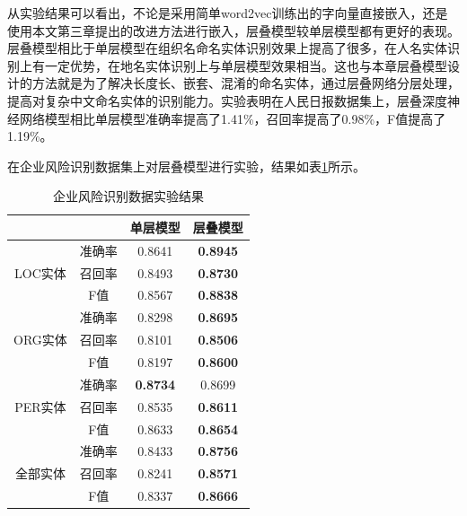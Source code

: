 \documentclass[winfonts,master,oneside,nobackinfo]{njuthesis}
\begin{document}
从实验结果可以看出，不论是采用简单word2vec训练出的字向量直接嵌入，还是使用本文第三章提出的改进方法进行嵌入，层叠模型较单层模型都有更好的表现。层叠模型相比于单层模型在组织名命名实体识别效果上提高了很多，在人名实体识别上有一定优势，在地名实体识别上与单层模型效果相当。这也与本章层叠模型设计的方法就是为了解决长度长、嵌套、混淆的命名实体，通过层叠网络分层处理，提高对复杂中文命名实体的识别能力。实验表明在人民日报数据集上，层叠深度神经网络模型相比单层模型准确率提高了1.41\%，召回率提高了0.98\%，F值提高了1.19\%。

在企业风险识别数据集上对层叠模型进行实验，结果如表\ref{risk}所示。
\begin{table}[H]
\centering
\begin{tabular}{|c|c|c|c|}
\hline
\multicolumn{2}{|c|}{}                  & 单层模型           & 层叠模型          \\ \hline
\multirow{3}{*}{LOC实体}       & 准确率      & 0.8641         & \textbf{0.8945}        \\ \cline{2-4} 
                             & 召回率      & 0.8493         & \textbf{0.8730}        \\ \cline{2-4} 
                             & F值       & 0.8567         & \textbf{0.8838}        \\ \hline
\multirow{3}{*}{ORG实体}       & 准确率      & 0.8298         & \textbf{0.8695}        \\ \cline{2-4} 
                             & 召回率      & 0.8101         & \textbf{0.8506}        \\ \cline{2-4} 
                             & F值       & 0.8197         & \textbf{0.8600}        \\ \hline
\multirow{3}{*}{PER实体}       & 准确率      & \textbf{0.8734}         & 0.8699        \\ \cline{2-4} 
                             & 召回率      & 0.8535         & \textbf{0.8611}        \\ \cline{2-4} 
                             & F值       & 0.8633         & \textbf{0.8654}        \\ \hline
\multirow{3}{*}{全部实体}        & 准确率      & 0.8433         & \textbf{0.8756}        \\ \cline{2-4} 
                             & 召回率      & 0.8241         & \textbf{0.8571}        \\ \cline{2-4} 
                             & F值       & 0.8337         &\textbf{0.8666}        \\ \hline
\end{tabular}
\caption{企业风险识别数据实验结果}
\label{risk}
\end{table}
\end{document}
